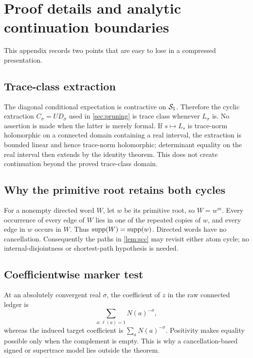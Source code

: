 \section{Proof details and analytic continuation boundaries}

This appendix records two points that are easy to lose in a compressed
presentation.

\subsection{Trace-class extraction}

The diagonal conditional expectation is contractive on $\mathcal S_1$.
Therefore the cyclic extraction $C_\sigma=UD_\sigma$ used in
\cref{sec:pruning} is trace class whenever $L_\sigma$ is.  No assertion is made
when the latter is merely formal.  If $s\mapsto L_s$ is trace-norm
holomorphic on a connected domain containing a real interval, the extraction
is bounded linear and hence trace-norm holomorphic; determinant equality on
the real interval then extends by the identity theorem.  This does not create
continuation beyond the proved trace-class domain.

\subsection{Why the primitive root retains both cycles}

For a nonempty directed word $W$, let $w$ be its primitive root, so
$W=w^m$.  Every occurrence of every edge of $W$ lies in one of the repeated
copies of $w$, and every edge in $w$ occurs in $W$.  Thus
$\operatorname{supp}(W)=\operatorname{supp}(w)$.  Directed words have no cancellation.  Consequently the
paths in \cref{lem:scc} may revisit either atom cycle; no internal-disjointness
or shortest-path hypothesis is needed.

\subsection{Coefficientwise marker test}

At an absolutely convergent real $\sigma$, the coefficient of $z$ in the
raw connected ledger is
\[
\sum_{a:\ell(a)=1}N(a)^{-\sigma},
\]
whereas the induced target coefficient is
$\sum_aN(a)^{-\sigma}$.  Positivity makes equality possible only when the
complement is empty.  This is why a cancellation-based signed or supertrace
model lies outside the theorem.
